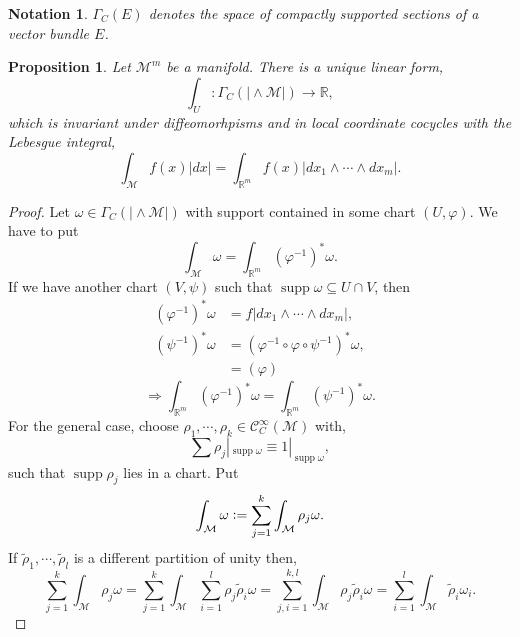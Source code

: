 \documentclass[10pt]{article}
\newtheorem{proposition}{Proposition}[section]
\newtheorem{notation}{Notation}[section]
\DeclareMathOperator{\supp}{supp}
\newcommand{\defeq}{\vcentcolon=}
\newcommand{\R}[0]{\mathbb{R}}
\newcommand{\M}[0]{\mathcal{M}}
\newcommand{\cinf}[0]{\mathcal{C}^\infty}
\begin{document}
  \begin{notation}
    $\Gamma_C(E)$ denotes the space of compactly supported sections of a vector bundle $E$.
  \end{notation}

\begin{proposition}
  Let $\M^m$ be a manifold. There is a unique linear form, 
  \begin{equation*}
    \int_{U}:\Gamma_C(\vert\wedge\M\vert) \to \R,
  \end{equation*}
  which is invariant under diffeomorhpisms and in local coordinate cocycles with the Lebesgue integral,
  \begin{equation*}
    \int_\M f(x)\vert dx\vert = \int_{\R^m} f(x)\vert dx_1\wedge\cdots\wedge dx_m\vert. 
  \end{equation*}
\end{proposition}
\begin{proof}
  Let $\omega\in\Gamma_C(\vert\wedge\M\vert)$ with support contained in some chart $(U,\varphi)$. We have to put 
  \begin{equation*}
    \int_\M\omega = \int_{\R^m}(\varphi^{-1})^*\omega.
  \end{equation*}
  If we have another chart $(V,\psi)$ such that $\supp \omega\subseteq U\cap V$, then 
  \begin{align*}
    (\varphi^{-1})^*\omega &= f\vert dx_1\wedge\cdots\wedge dx_m\vert,\\
    (\psi^{-1})^*\omega & = (\varphi^{-1}\circ\varphi\circ\psi^{-1})^*\omega,\\
     & = (\varphi)
  \end{align*}
  \begin{equation*}
    \Rightarrow \int_{\R^m}(\varphi^{-1})^*\omega = \int_{\R^m}(\psi^{-1})^*\omega.
  \end{equation*}
  For the general case, choose $\rho_1,\cdots,\rho_k\in\cinf_C(\M)$ with,
  \begin{equation*}
    \sum \rho_j|_{\supp\omega} \equiv 1|_{\supp\omega},
  \end{equation*}
  such that $\supp\rho_j$ lies in a chart. Put 
  \begin{equation*}
    \int_\M\omega \defeq \sum_{j=1}^k\int_\M\rho_j\omega.
  \end{equation*}
  If $\tilde{\rho}_1,\cdots,\tilde{\rho}_l$ is a different partition of unity then,
  \begin{equation*}
    \sum_{j=1}^k\int_\M\rho_j\omega = \sum_{j=1}^k\int_\M\sum_{i=1}^l\rho_j\tilde{\rho}_i\omega = \sum_{j,i=1}^{k,l}\int_\M\rho_j\tilde{\rho}_i\omega = \sum_{i=1}^l\int_\M\tilde{\rho}_i\omega_i.
  \end{equation*}
\end{proof}
\end{document}
